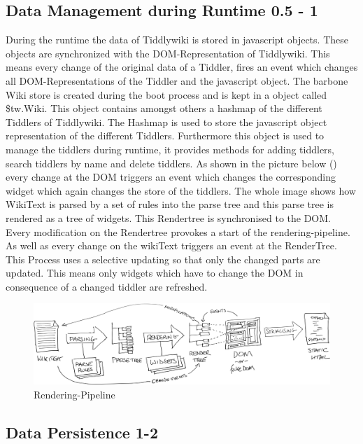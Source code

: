 \documentclass[12pt,a4paper]{article}
\begin{document}
\subsection{Data Management during Runtime 0.5 - 1}
During the runtime the data of Tiddlywiki is stored in javascript objects. These objects are synchronized with the DOM-Representation of Tiddlywiki. This means every change of the original data of a Tiddler, fires an event which changes all DOM-Representations of the Tiddler and the javascript object. The barbone Wiki store is created during the boot process and is kept in a object called \$tw.Wiki. This object contains amongst others a hashmap of the different Tiddlers of Tiddlywiki. The Hashmap is used to store the javascript object representation of the different Tiddlers. Furthermore this object is used to manage the tiddlers during runtime, it provides methods for adding tiddlers, search tiddlers by name and delete tiddlers.
As shown in the picture below () every change at the DOM triggers an event which changes the corresponding widget which again changes the store of the tiddlers. The whole image shows how WikiText is parsed by a set of rules into the parse tree and this parse tree is rendered as a tree of widgets. This Rendertree is synchronised to the DOM. Every modification on the Rendertree provokes a start of the rendering-pipeline. As well as every change on the wikiText triggers an event at the RenderTree. This Process uses a selective updating so that only the changed parts are updated. This means only widgets which have to change the DOM in consequence of a changed tiddler are refreshed.
\begin{figure}[hbtp]
\caption{Rendering-Pipeline\protect\cite{TIDD:ARCH}}
\label{fig:rendering}
\includegraphics[scale=0.075]{images/TiddlyWikiArchitecture.png}
\end{figure}

\newpage
\subsection{Data Persistence 1-2}
\end{document}
